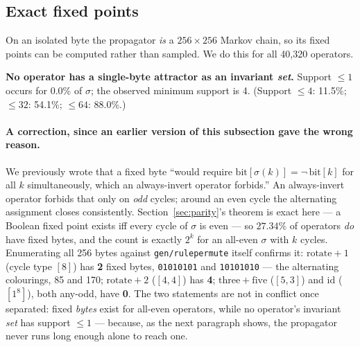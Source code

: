 \documentclass[man,12pt,floatsintext]{apa7}
\newif\ifdraftnotes
\newcommand{\owed}[1]{\ifdraftnotes\textcolor{owedcol}{\small\textbf{[OWED:} #1\textbf{]}}\fi}
\newcommand{\sig}{\sigma}
\newcommand{\bit}[1]{\mathrm{bit}[#1]}
\begin{document}
\owed{Three seeds per $\sig$. Every live/dead and collapse-target claim
rests on this, and it is the first thing a reviewer will find (TN
``Known weaknesses'' item 1). The fix is costed: a JAX MetaCA port
\emph{with blending} gives 100+ seeds cheaply. This is the one place a JAX
census genuinely pays --- the wide-grid version was killed by the pooling
test (Section~\ref{sec:geometry}).}

\owed{Width 60, 120 generations. Defensible --- the Figure-8 transient is
8--20 generations --- but it will be asked, so answer it in the text
rather than in rebuttal.}

\subsection{Exact fixed points}
\label{sec:fixedpoints}

On an isolated byte the propagator \emph{is} a $256 \times 256$ Markov
chain, so its fixed points can be computed rather than sampled. We do this
for all 40{,}320 operators.

\textbf{No operator has a single-byte attractor as an invariant \emph{set}.}
Support $\le 1$ occurs for 0.0\% of $\sig$; the observed minimum support is 4.
(Support $\le 4$: 11.5\%; $\le 32$: 54.1\%; $\le 64$: 88.0\%.)

\paragraph{A correction, since an earlier version of this subsection gave the
wrong reason.} We previously wrote that a fixed byte ``would require
$\bit{\sig(k)} = \lnot\,\bit{k}$ for all $k$ simultaneously, which an
always-invert operator forbids.'' An always-invert operator forbids that only on
\emph{odd} cycles; around an even cycle the alternating assignment closes
consistently. Section~\ref{sec:parity}'s theorem is exact here --- a Boolean
fixed point exists iff every cycle of $\sig$ is even --- so $27.34\%$ of
operators \emph{do} have fixed bytes, and the count is exactly $2^{k}$ for an
all-even $\sig$ with $k$ cycles. Enumerating all 256 bytes against
\texttt{gen/rule\-permute} itself confirms it: $\mathrm{rotate}{+}1$ (cycle type
$[8]$) has \textbf{2} fixed bytes, \texttt{01010101} and \texttt{10101010} --- the
alternating colourings, 85 and 170; $\mathrm{rotate}{+}2$ ($[4,4]$) has
\textbf{4}; $\mathrm{three{+}five}$ ($[5,3]$) and $\mathrm{id}$ ($[1^8]$), both
any-odd, have \textbf{0}. The two statements are not in conflict once separated:
fixed \emph{bytes} exist for all-even operators, while no operator's invariant
\emph{set} has support $\le 1$ --- because, as the next paragraph shows, the
propagator never runs long enough alone to reach one.
\end{document}
